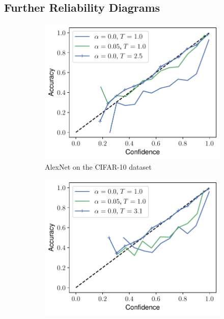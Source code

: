 \subsection{Further Reliability Diagrams}

\begin{figure}[ht]
\centering
    \begin{subfigure}{.45\textwidth}
    \centering
    \includegraphics[width=\linewidth]{figures/reliability_alexnet_cifar10.pdf}
    \caption{AlexNet on the CIFAR-10 dataset}
\end{subfigure}
\hfill
\begin{subfigure}{.45\textwidth}
    \centering
    \includegraphics[width=\linewidth]{figures/reliability_resnet_cifar10.pdf}

\end{subfigure}
\end{figure}

